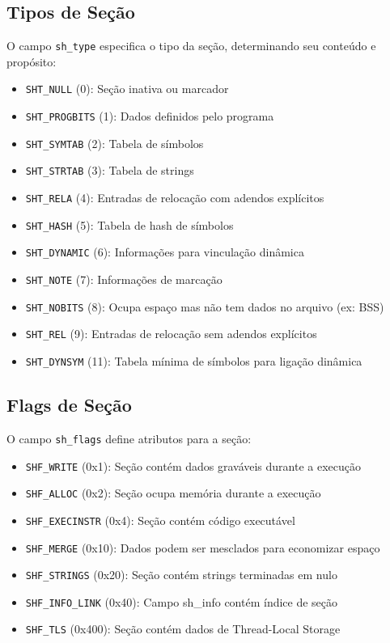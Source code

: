 \subsection{Tipos de Seção}\label{subsec:section_types}

O campo \texttt{sh\_type} especifica o tipo da seção, determinando seu conteúdo e propósito:

\begin{itemize}
    \item \texttt{SHT\_NULL} (0): Seção inativa ou marcador
    \item \texttt{SHT\_PROGBITS} (1): Dados definidos pelo programa
    \item \texttt{SHT\_SYMTAB} (2): Tabela de símbolos
    \item \texttt{SHT\_STRTAB} (3): Tabela de strings
    \item \texttt{SHT\_RELA} (4): Entradas de relocação com adendos explícitos
    \item \texttt{SHT\_HASH} (5): Tabela de hash de símbolos
    \item \texttt{SHT\_DYNAMIC} (6): Informações para vinculação dinâmica
    \item \texttt{SHT\_NOTE} (7): Informações de marcação
    \item \texttt{SHT\_NOBITS} (8): Ocupa espaço mas não tem dados no arquivo (ex: BSS)
    \item \texttt{SHT\_REL} (9): Entradas de relocação sem adendos explícitos
    \item \texttt{SHT\_DYNSYM} (11): Tabela mínima de símbolos para ligação dinâmica
\end{itemize}

\subsection{Flags de Seção}\label{subsec:section_flags}

O campo \texttt{sh\_flags} define atributos para a seção:

\begin{itemize}
    \item \texttt{SHF\_WRITE} (0x1): Seção contém dados graváveis durante a execução
    \item \texttt{SHF\_ALLOC} (0x2): Seção ocupa memória durante a execução
    \item \texttt{SHF\_EXECINSTR} (0x4): Seção contém código executável
    \item \texttt{SHF\_MERGE} (0x10): Dados podem ser mesclados para economizar espaço
    \item \texttt{SHF\_STRINGS} (0x20): Seção contém strings terminadas em nulo
    \item \texttt{SHF\_INFO\_LINK} (0x40): Campo sh\_info contém índice de seção
    \item \texttt{SHF\_TLS} (0x400): Seção contém dados de Thread-Local Storage
\end{itemize}

